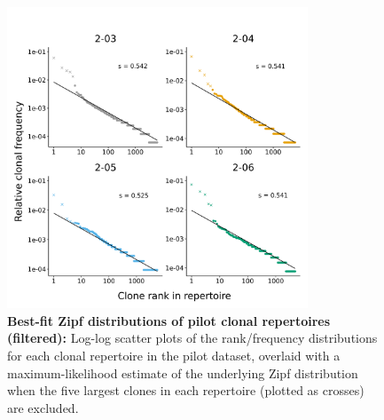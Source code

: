 \begin{figure}
\centering
\includegraphics[width=0.8\textwidth]{_Figures/png/pilot-clones-zipf-fit}
\caption[Best-fit Zipf distributions of pilot clonal repertoires (filtered)]{\textbf{Best-fit Zipf distributions of pilot clonal repertoires (filtered):} Log-log scatter plots of the rank/frequency distributions for each clonal repertoire in the pilot dataset, overlaid with a maximum-likelihood estimate of the underlying Zipf distribution when the five largest clones in each repertoire (plotted as crosses) are excluded.}
\label{fig:igseq-pilot-clones-zipf-fit}
\end{figure}

